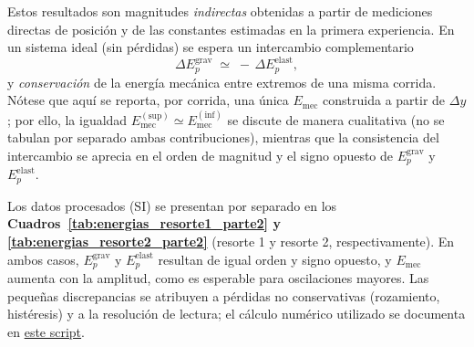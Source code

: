 \documentclass[11pt,twocolumn]{article}
\begin{document}
Estos resultados son magnitudes \emph{indirectas} obtenidas a partir de mediciones directas de posición y de las constantes estimadas en la primera experiencia. En un sistema ideal (sin pérdidas) se espera un intercambio complementario
\begin{equation*}
    \Delta E_p^{\text{grav}} \;\simeq\; -\,\Delta E_p^{\text{elast}},
\end{equation*}
y \emph{conservación} de la energía mecánica entre extremos de una misma corrida. Nótese que aquí se reporta, por corrida, una única $E_{\text{mec}}$ construida a partir de $\Delta y$; por ello, la igualdad 
$E_{\text{mec}}^{(\text{sup})}\simeq E_{\text{mec}}^{(\text{inf})}$ se discute de manera cualitativa (no se tabulan por separado ambas contribuciones), mientras que la consistencia del intercambio se aprecia en el orden de magnitud y el signo opuesto de $E_p^{\text{grav}}$ y $E_p^{\text{elast}}$.

Los datos procesados (SI) se presentan por separado en los 
\textbf{Cuadros~\ref{tab:energias_resorte1_parte2} y \ref{tab:energias_resorte2_parte2}} (resorte 1 y resorte 2, respectivamente). 
En ambos casos, $E_p^{\text{grav}}$ y $E_p^{\text{elast}}$ resultan de igual orden y signo opuesto, y $E_{\text{mec}}$ aumenta con la amplitud, como es esperable para oscilaciones mayores. 
Las pequeñas discrepancias se atribuyen a pérdidas no conservativas (rozamiento, histéresis) y a la resolución de lectura; el cálculo numérico utilizado se documenta en \textcolor{RoyalBlue}{\href{https://udeconce-my.sharepoint.com/:u:/g/personal/jrosas2022_udec_cl/EUfovUYl6rNPt2OGXzgADrQBErnsWO_q4iUNOX2jXK_ufg?e=lfyL2F}{este script}}.
\end{document}

